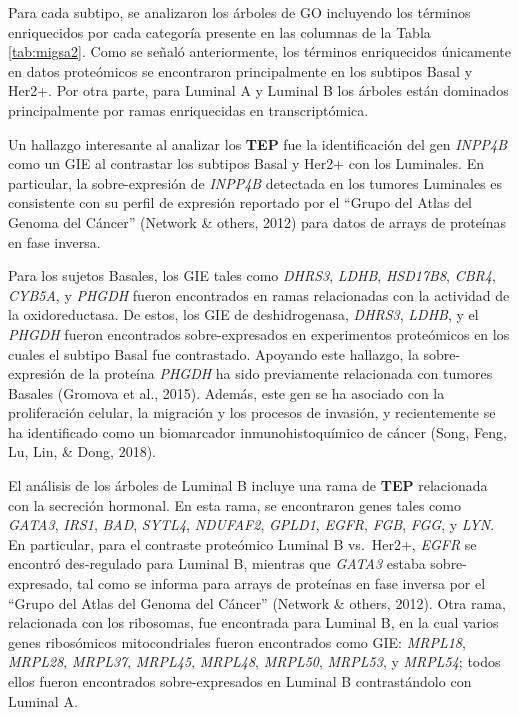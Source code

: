 \documentclass[12pt,twoside]{reedthesis}
\begin{document}
\par

Para cada subtipo, se analizaron los árboles de GO incluyendo los términos enriquecidos por cada categoría presente en las columnas de la Tabla \ref{tab:migsa2}. Como se señaló anteriormente, los términos enriquecidos únicamente en datos proteómicos se encontraron principalmente en los subtipos Basal y Her2+. Por otra parte, para Luminal A y Luminal B los árboles están dominados principalmente por ramas enriquecidas en transcriptómica.

\par

Un hallazgo interesante al analizar los \textbf{TEP} fue la identificación del gen \emph{INPP4B} como un GIE al contrastar los subtipos Basal y Her2+ con los Luminales. En particular, la sobre-expresión de \emph{INPP4B} detectada en los tumores Luminales es consistente con su perfil de expresión reportado por el ``Grupo del Atlas del Genoma del Cáncer'' (Network \& others, 2012) para datos de arrays de proteínas en fase inversa.

\par

Para los sujetos Basales, los GIE tales como \emph{DHRS3}, \emph{LDHB}, \emph{HSD17B8}, \emph{CBR4}, \emph{CYB5A}, y \emph{PHGDH} fueron encontrados en ramas relacionadas con la actividad de la oxidoreductasa. De estos, los GIE de deshidrogenasa, \emph{DHRS3}, \emph{LDHB}, y el \emph{PHGDH} fueron encontrados sobre-expresados en experimentos proteómicos en los cuales el subtipo Basal fue contrastado. Apoyando este hallazgo, la sobre-expresión de la proteína \emph{PHGDH} ha sido previamente relacionada con tumores Basales (Gromova et al., 2015). Además, este gen se ha asociado con la proliferación celular, la migración y los procesos de invasión, y recientemente se ha identificado como un biomarcador inmunohistoquímico de cáncer (Song, Feng, Lu, Lin, \& Dong, 2018).

\par

El análisis de los árboles de Luminal B incluye una rama de \textbf{TEP} relacionada con la secreción hormonal. En esta rama, se encontraron genes tales como \emph{GATA3}, \emph{IRS1}, \emph{BAD}, \emph{SYTL4}, \emph{NDUFAF2}, \emph{GPLD1}, \emph{EGFR}, \emph{FGB}, \emph{FGG}, y \emph{LYN}. En particular, para el contraste proteómico Luminal B vs.~Her2+, \emph{EGFR} se encontró des-regulado para Luminal B, mientras que \emph{GATA3} estaba sobre-expresado, tal como se informa para arrays de proteínas en fase inversa por el ``Grupo del Atlas del Genoma del Cáncer'' (Network \& others, 2012). Otra rama, relacionada con los ribosomas, fue encontrada para Luminal B, en la cual varios genes ribosómicos mitocondriales fueron encontrados como GIE: \emph{MRPL18}, \emph{MRPL28}, \emph{MRPL37}, \emph{MRPL45}, \emph{MRPL48}, \emph{MRPL50}, \emph{MRPL53}, y \emph{MRPL54}; todos ellos fueron encontrados sobre-expresados en Luminal B contrastándolo con Luminal A.
\end{document}
